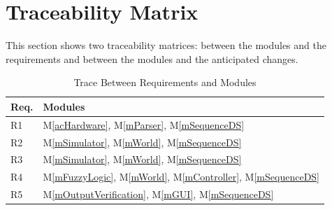 \documentclass[12pt, titlepage]{article}
\newcommand{\mref}[1]{M\ref{#1}}
\begin{document}



\section{Traceability Matrix} \label{SecTM}

This section shows two traceability matrices: between the modules and the
requirements and between the modules and the anticipated changes.

\begin{table}[H]
\centering
\begin{tabular}{p{} p{}}
\toprule
\textbf{Req.} & \textbf{Modules}\\
\midrule
R1 & \mref{acHardware}, \mref{mParser}, \mref{mSequenceDS}\\
R2 & \mref{mSimulator}, \mref{mWorld}, \mref{mSequenceDS}\\
R3 & \mref{mSimulator}, \mref{mWorld}, \mref{mSequenceDS}\\
R4 & \mref{mFuzzyLogic}, \mref{mWorld}, \mref{mController}, \mref{mSequenceDS}\\
R5 & \mref{mOutputVerification}, \mref{mGUI}, \mref{mSequenceDS}\\
\bottomrule
\end{tabular}
\caption{Trace Between Requirements and Modules}
\label{TblRT}
\end{table}
\end{document}
